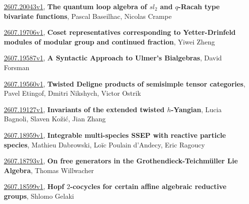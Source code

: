 \documentclass[9pt, a4paper]{article}
\theoremstyle{plain}
\theoremstyle{definition}
\theoremstyle{remark}
\newcommand{\arxiv}[3]{\href{https://arxiv.org/abs/#1}{#1}, \textbf{\textcolor{arxivblue}{#2}}, #3}
\begin{document}
\arxiv{2607.20043v1}{The quantum loop algebra of $sl_2$ and $q$-Racah type bivariate functions}{Pascal Baseilhac, Nicolas Crampe}

\arxiv{2607.19706v1}{Coset representatives corresponding to Yetter-Drinfeld modules of modular group and continued fraction}{Yiwei Zheng}

\arxiv{2607.19587v1}{A Syntactic Approach to Ulmer's Bialgebras}{David Forsman}

\arxiv{2607.19560v1}{Twisted Deligne products of semisimple tensor categories}{Pavel Etingof, Dmitri Nikshych, Victor Ostrik}

\arxiv{2607.19127v1}{Invariants of the extended twisted $h$-Yangian}{Lucia Bagnoli, Slaven Kožić, Jian Zhang}

\arxiv{2607.18959v1}{Integrable multi-species SSEP with reactive particle species}{Mathieu Dabrowski, Loïc Poulain d'Andecy, Eric Ragoucy}

\arxiv{2607.18793v1}{On free generators in the Grothendieck-Teichmüller Lie Algebra}{Thomas Willwacher}

\arxiv{2607.18599v1}{Hopf $2$-cocycles for certain affine algebraic reductive groups}{Shlomo Gelaki}

\end{document}
